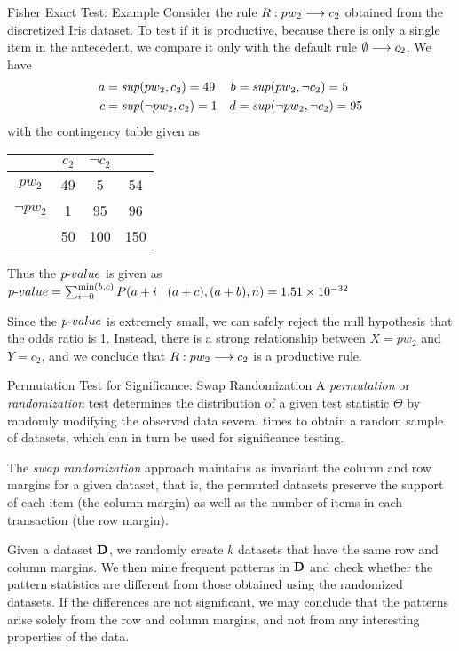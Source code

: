 \begin{frame}{Fisher Exact Test: Example}
  \small
  Consider the rule $R: pw_2 \arule c_2$ obtained from the discretized Iris
  dataset. To test if it is productive, because there is only a single
  item in the antecedent, we compare it only with the default rule
  $\emptyset \arule c_2$. We have
  \begin{align*}
    a & = \mathit{sup}(pw_2,c_2) = 49 &
    b & = \mathit{sup}(pw_2,\neg c_2) = 5\\
    c & = \mathit{sup}(\neg pw_2,c_2) = 1 &
    d & = \mathit{sup}(\neg pw_2, \neg c_2) = 95
  \end{align*}
  with the contingency table given as

  \begin{center}
{\renewcommand{\arraystretch}{1.1}  \begin{tabular}{|c|cc|c|}
    \hline
  & $c_2$ & $\neg c_2$ & \\ \hline
  $pw_2$ & 49 & 5 & 54\\
  $\neg pw_2$ & 1 & 95 & 96\\ \hline
  & 50 & 100 & 150\\ \hline
  \end{tabular}}
\end{center}

  Thus the ${p\text{-}value}$ is given as
    ${p\text{-}value}  = \sum_{i=0}^{\min(b,c)} P(a+i \mid (a+c),(a+b),n) = 
    1.51 \times 10^{-32}$

	\medskip
  Since the ${p\text{-}value}$ is extremely small, we can safely reject the null
  \hbox{hypothesis} that the odds ratio is 1. Instead, there is a strong
  relationship between $X=pw_2$ and $Y=c_2$, and we conclude
  that $R:pw_2\arule c_2$
  is a productive rule.
\end{frame}


\begin{frame}{Permutation Test for Significance: Swap Randomization}
A {\em permutation} or {\em randomization} test determines
the distribution of a given test statistic $\Theta$ by randomly
modifying the observed data several times to obtain a random
sample of datasets, which can in turn be used for signif\/{i}cance
testing. 


\medskip
The {\em swap randomization} approach
maintains as invariant the column and row margins for a given dataset,
that is, the permuted datasets preserve the support of each item (the
column margin) as well as the number of items in each transaction (the
row margin).  

\medskip
Given a dataset $\mathbf{D}$, we randomly create $k$
datasets that have the same row and column margins. We then mine
frequent patterns in $\mathbf{D}$ and check whether the pattern statistics are different
from those obtained using the randomized datasets. If the differences
are not signif\/{i}cant, we may conclude that the patterns arise solely from
the row and column margins, and not from any interesting properties of
the data.
\end{frame}


